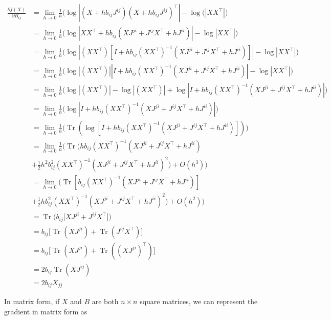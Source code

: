 \documentclass{article}
\theoremstyle{definition}
\DeclareMathOperator{\Tr}{Tr}
\begin{document}
\begin{equation}
    \label{eqn:gradLogDetElement}
    \begin{split}
        \frac{\partial f(X)}{\partial B_{ij}} &= \lim_{h \to 0} \frac{1}{h}\bigg(\log|(X + hb_{ij}J^{ij}) (X + hb_{ij}J^{ij})^\top| - \log(|XX^\top| \bigg) \\
        &= \lim_{h \to 0} \frac{1}{h} \bigg(\log|XX^\top + hb_{ij}(XJ^{ji} + J^{ij}X^\top + hJ^{ii})| - \log|XX^\top| \bigg) \\ 
        & = \lim_{h \to 0} \frac{1}{h} \bigg(\log|(XX^\top)[I + hb_{ij}(XX^\top)^{-1}(XJ^{ji} + J^{ij}X^\top + hJ^{ii})]| - \log|XX^\top| \bigg) \\ 
        & = \lim_{h \to 0} \frac{1}{h} \bigg(\log|(XX^\top)||I + hb_{ij}(XX^\top)^{-1}(XJ^{ji} + J^{ij}X^\top + hJ^{ii})| - \log|XX^\top| \bigg) \\ 
        & = \lim_{h \to 0} \frac{1}{h} \bigg( \log|(XX^\top)| - \log|(XX^\top)| + \log|I + hb_{ij}(XX^\top)^{-1}(XJ^{ji} + J^{ij}X^\top + hJ^{ii})| \bigg) \\
        & = \lim_{h \to 0} \frac{1}{h} \bigg(\log|I + hb_{ij}(XX^\top)^{-1}(XJ^{ji} + J^{ij}X^\top + hJ^{ii})| \bigg) \\
        & = \lim_{h \to 0} \frac{1}{h} \bigg( \Tr (\log[I + hb_{ij}(XX^\top)^{-1}(XJ^{ji} + J^{ij}X^\top + hJ^{ii})]) \bigg) \\ 
        & = \lim_{h \to 0} \frac{1}{h} \bigg( \Tr (hb_{ij}(XX^\top)^{-1}(XJ^{ji} + J^{ij}X^\top + hJ^{ii}) \\ 
        & + \frac{1}{2} h^2 b_{ij}^2 (XX^\top)^{-1}(XJ^{ji} + J^{ij}X^\top + hJ^{ii})^2) + O(h^3) \bigg) \\ 
        & = \lim_{h \to 0} \bigg(\Tr [b_{ij}(XX^\top)^{-1}(XJ^{ji} + J^{ij}X^\top + hJ^{ii})] \\ 
        & + \frac{1}{2} h b_{ij}^2 (XX^\top)^{-1}(XJ^{ji} + J^{ij}X^\top + hJ^{ii})^2) + O(h^2) \bigg) \\ 
        & = \Tr\big(b_{ij}[XJ^{ji} + J^{ij}X^\top\big]) \\ 
        & = b_{ij}\big[\Tr(XJ^{ji}) + \Tr(J^{ij}X^\top)\big] \\ 
        & = b_{ij}\big[\Tr(XJ^{ji}) + \Tr((XJ^{ji})^\top)\big] \\ 
        & = 2b_{ij} \Tr(XJ^{ij}) \\ 
        & = 2 b_{ij}X_{jj}
    \end{split}
\end{equation}

In matrix form, if $X$ and $B$ are both $n \times n$ square matrices, we can represent the gradient in matrix form as
\end{document}
